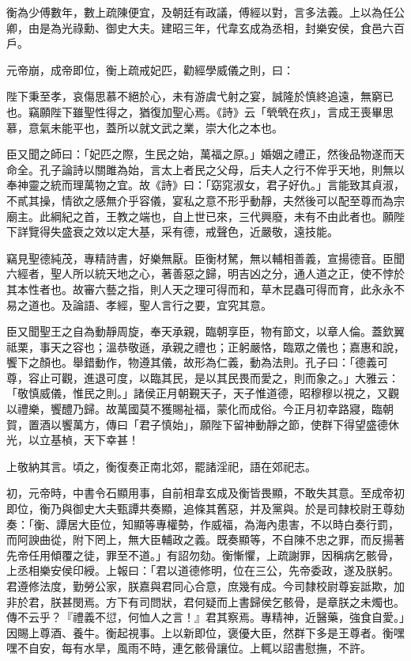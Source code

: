 \begin{pinyinscope}
衡為少傅數年，數上疏陳便宜，及朝廷有政議，傅經以對，言多法義。上以為任公卿，由是為光祿勳、御史大夫。建昭三年，代韋玄成為丞相，封樂安侯，食邑六百戶。

元帝崩，成帝即位，衡上疏戒妃匹，勸經學威儀之則，曰：

陛下秉至孝，哀傷思慕不絕於心，未有游虞弋射之宴，誠隆於慎終追遠，無窮已也。竊願陛下雖聖性得之，猶復加聖心焉。《詩》云「煢煢在疚」，言成王喪畢思慕，意氣未能平也，蓋所以就文武之業，崇大化之本也。

臣又聞之師曰：「妃匹之際，生民之始，萬福之原。」婚姻之禮正，然後品物遂而天命全。孔子論詩以關雎為始，言太上者民之父母，后夫人之行不侔乎天地，則無以奉神靈之統而理萬物之宜。故《詩》曰：「窈窕淑女，君子好仇。」言能致其貞淑，不貳其操，情欲之感無介乎容儀，宴私之意不形乎動靜，夫然後可以配至尊而為宗廟主。此綱紀之首，王教之端也，自上世已來，三代興廢，未有不由此者也。願陛下詳覽得失盛衰之效以定大基，采有德，戒聲色，近嚴敬，遠技能。

竊見聖德純茂，專精詩書，好樂無厭。臣衡材駑，無以輔相善義，宣揚德音。臣聞六經者，聖人所以統天地之心，著善惡之歸，明吉凶之分，通人道之正，使不悖於其本性者也。故審六藝之指，則人天之理可得而和，草木昆蟲可得而育，此永永不易之道也。及論語、孝經，聖人言行之要，宜究其意。

臣又聞聖王之自為動靜周旋，奉天承親，臨朝享臣，物有節文，以章人倫。蓋欽翼祗栗，事天之容也；溫恭敬遜，承親之禮也；正躬嚴恪，臨眾之儀也；嘉惠和說，饗下之顏也。舉錯動作，物遵其儀，故形為仁義，動為法則。孔子曰：「德義可尊，容止可觀，進退可度，以臨其民，是以其民畏而愛之，則而象之。」大雅云：「敬慎威儀，惟民之則。」諸侯正月朝覲天子，天子惟道德，昭穆穆以視之，又觀以禮樂，饗醴乃歸。故萬國莫不獲賜祉福，蒙化而成俗。今正月初幸路寢，臨朝賀，置酒以饗萬方，傳曰「君子慎始」，願陛下留神動靜之節，使群下得望盛德休光，以立基楨，天下幸甚！

上敬納其言。頃之，衡復奏正南北郊，罷諸淫祀，語在郊祀志。

初，元帝時，中書令石顯用事，自前相韋玄成及衡皆畏顯，不敢失其意。至成帝初即位，衡乃與御史大夫甄譚共奏顯，追條其舊惡，并及黨與。於是司隸校尉王尊劾奏：「衡、譚居大臣位，知顯等專權勢，作威福，為海內患害，不以時白奏行罰，而阿諛曲從，附下罔上，無大臣輔政之義。既奏顯等，不自陳不忠之罪，而反揚著先帝任用傾覆之徒，罪至不道。」有詔勿劾。衡慚懼，上疏謝罪，因稱病乞骸骨，上丞相樂安侯印綬。上報曰：「君以道德修明，位在三公，先帝委政，遂及朕躬。君遵修法度，勤勞公家，朕嘉與君同心合意，庶幾有成。今司隸校尉尊妄詆欺，加非於君，朕甚閔焉。方下有司問狀，君何疑而上書歸侯乞骸骨，是章朕之未燭也。傳不云乎？『禮義不愆，何恤人之言！』君其察焉。專精神，近醫藥，強食自愛。」因賜上尊酒、養牛。衡起視事。上以新即位，褒優大臣，然群下多是王尊者。衡嘿嘿不自安，每有水旱，風雨不時，連乞骸骨讓位。上輒以詔書慰撫，不許。


\end{pinyinscope}

